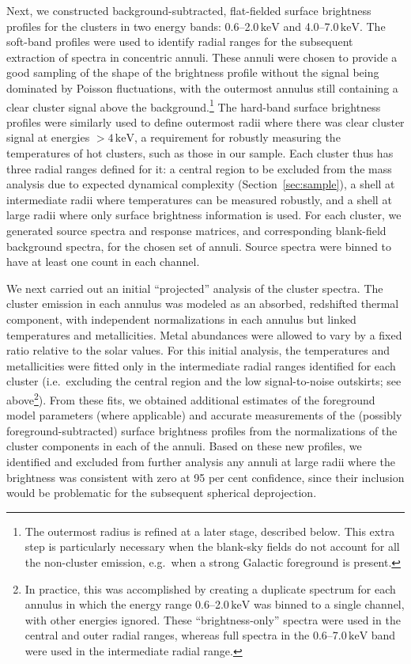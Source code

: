 \documentclass[useAMS,usenatbib,usegraphicx]{mn2e}
\newcommand*{\unit}[1]{\ensuremath{\mathrm{\, #1}}}
\newcommand*{\keV}{\unit{keV}}
\newcommand*{\secref}{Section}
\begin{document}
Next, we constructed background-subtracted, flat-fielded surface brightness profiles for the clusters in two energy bands: 0.6--2.0\keV{} and 4.0--7.0\keV{}. The soft-band profiles were used to identify radial ranges for the subsequent extraction of spectra in concentric annuli. These annuli were chosen to provide a good sampling of the shape of the brightness profile without the signal being dominated by Poisson fluctuations, with the outermost annulus still containing a clear cluster signal above the background.\footnote{The outermost radius is refined at a later stage, described below. This extra step is particularly necessary when the blank-sky fields do not account for all the non-cluster emission, e.g.\ when a strong Galactic foreground is present.} The hard-band surface brightness profiles were similarly used to define outermost radii where there was clear cluster signal at energies $>4\keV$, a requirement for robustly measuring the temperatures of hot clusters, such as those in our sample. Each cluster thus has three radial ranges defined for it: a central region to be excluded from the mass analysis due to expected dynamical complexity (\secref~\ref{sec:sample}), a shell at intermediate radii where temperatures can be measured robustly, and a shell at large radii where only surface brightness information is used. For each cluster, we generated source spectra and response matrices, and corresponding blank-field background spectra, for the chosen set of annuli. Source spectra were binned to have at least one count in each channel.

We next carried out an initial ``projected'' analysis of the cluster spectra. The cluster emission in each annulus was modeled as an absorbed, redshifted thermal component, with independent normalizations in each annulus but linked temperatures and metallicities. Metal abundances were allowed to vary by a fixed ratio relative to the solar values. For this initial analysis, the temperatures and metallicities were fitted only in the intermediate radial ranges identified for each cluster (i.e.\ excluding the central region and the low signal-to-noise outskirts; see above\footnote{In practice, this was accomplished by creating a duplicate spectrum for each annulus in which the energy range 0.6--2.0\keV{} was binned to a single channel, with other energies ignored. These ``brightness-only'' spectra were used in the central and outer radial ranges, whereas full spectra in the 0.6--7.0\keV{} band were used in the intermediate radial range.}). From these fits, we obtained additional estimates of the foreground model parameters (where applicable) and accurate measurements of the (possibly foreground-subtracted) surface brightness profiles from the normalizations of the cluster components in each of the annuli. Based on these new profiles, we identified and excluded from further analysis any annuli at large radii where the brightness was consistent with zero at 95 per cent confidence, since their inclusion would be problematic for the subsequent spherical deprojection.
\end{document}
